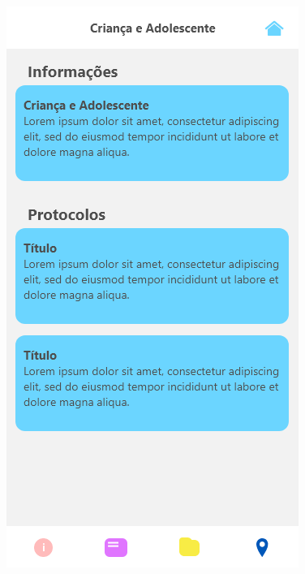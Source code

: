 \documentclass[
	12pt,				%
	openright,			%
	oneside,			%
	a4paper,			%
	english,			%
	brazil,				%
	]{abntex2}
\theoremstyle{theorem}
\theoremstyle{definition}
\begin{document}
\begin{figure}[H]
\begin{minipage}{.3\textwidth}
  \includegraphics[width=.9\linewidth]{imagens/prototipoProtocolos.png}
  \label{fig: Tela de protocolos}
\end{minipage}%
\begin{minipage}{.3\textwidth}
  \centering

\end{minipage}
\end{figure}
\end{document}
